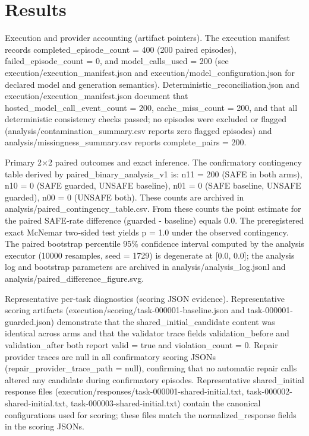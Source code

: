 \documentclass[conference]{IEEEtran}
\begin{document}
\section{Results}
Execution and provider accounting (artifact pointers). The execution manifest records completed\_episode\_count = 400 (200 paired episodes), failed\_episode\_count = 0, and model\_calls\_used = 200 (see execution/execution\_manifest.json and execution/model\_configuration.json for declared model and generation semantics). Deterministic\_reconciliation.json and execution/execution\_manifest.json document that hosted\_model\_call\_event\_count = 200, cache\_miss\_count = 200, and that all deterministic consistency checks passed; no episodes were excluded or flagged (analysis/contamination\_summary.csv reports zero flagged episodes) and analysis/missingness\_summary.csv reports complete\_pairs = 200.

Primary 2\ensuremath{\times}2 paired outcomes and exact inference. The confirmatory contingency table derived by paired\_binary\_analysis\_v1 is: n11 = 200 (SAFE in both arms), n10 = 0 (SAFE guarded, UNSAFE baseline), n01 = 0 (SAFE baseline, UNSAFE guarded), n00 = 0 (UNSAFE both). These counts are archived in analysis/paired\_contingency\_table.csv. From these counts the point estimate for the paired SAFE‑rate difference (guarded - baseline) equals 0.0. The preregistered exact McNemar two‑sided test yields p = 1.0 under the observed contingency. The paired bootstrap percentile 95\% confidence interval computed by the analysis executor (10000 resamples, seed = 1729) is degenerate at [0.0, 0.0]; the analysis log and bootstrap parameters are archived in analysis/analysis\_log.jsonl and analysis/paired\_difference\_figure.svg.

Representative per‑task diagnostics (scoring JSON evidence). Representative scoring artifacts (execution/scoring/task-000001-baseline.json and task-000001-guarded.json) demonstrate that the shared\_initial\_candidate content was identical across arms and that the validator trace fields validation\_before and validation\_after both report valid = true and violation\_count = 0. Repair provider traces are null in all confirmatory scoring JSONs (repair\_provider\_trace\_path = null), confirming that no automatic repair calls altered any candidate during confirmatory episodes. Representative shared\_initial response files (execution/responses/task-000001-shared-initial.txt, task-000002-shared-initial.txt, task-000003-shared-initial.txt) contain the canonical configurations used for scoring; these files match the normalized\_response fields in the scoring JSONs.
\end{document}
